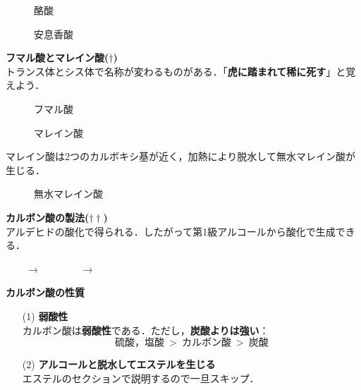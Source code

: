 \documentclass[a4paper,12pt]{ltjsreport}
\begin{document}
\begin{minipage}{0.5\linewidth}
\begin{figure}[H]
    \centering
\caption{酪酸} 
\end{figure}
\end{minipage}
\begin{minipage}{0.5\linewidth}
\begin{figure}[H]
    \centering
\caption{安息香酸} 
\end{figure}
\end{minipage}
\noindent \textbf{フマル酸とマレイン酸($\dag$)}\\
トランス体とシス体で名称が変わるものがある．「\textbf{虎に踏まれて稀に死す}」と覚えよう．
\begin{minipage}{0.5\linewidth}
\begin{figure}[H]
\centering
{}
\caption{フマル酸}
\end{figure}
\end{minipage}
\begin{minipage}{0.5\linewidth}
\begin{figure}[H]
\centering
{}
\caption{マレイン酸}
\end{figure}
\end{minipage}
マレイン酸は2つのカルボキシ基が近く，加熱により脱水して無水マレイン酸が生じる．
\begin{figure}[H]
\centering
{}
\caption{無水マレイン酸}
\end{figure}
\noindent \textbf{カルボン酸の製法($\dag\dag$)}\\
アルデヒドの酸化で得られる．したがって第1級アルコールから酸化で生成できる．\\[4pt]
\centerline{~~~~$\longrightarrow$~~~~~~~~$\longrightarrow$~~~~}
\noindent\textbf{カルボン酸の性質}
\begin{itemize}
    \item [(1)]\textbf{弱酸性}\\
    カルボン酸は\textbf{弱酸性}である．ただし，\textbf{炭酸よりは強い}：
    \[硫酸，塩酸~>~カルボン酸~>~炭酸\]
    \item[(2)]\textbf{アルコールと脱水してエステルを生じる}\\
    エステルのセクションで説明するので一旦スキップ．
\end{itemize}
\end{document}
